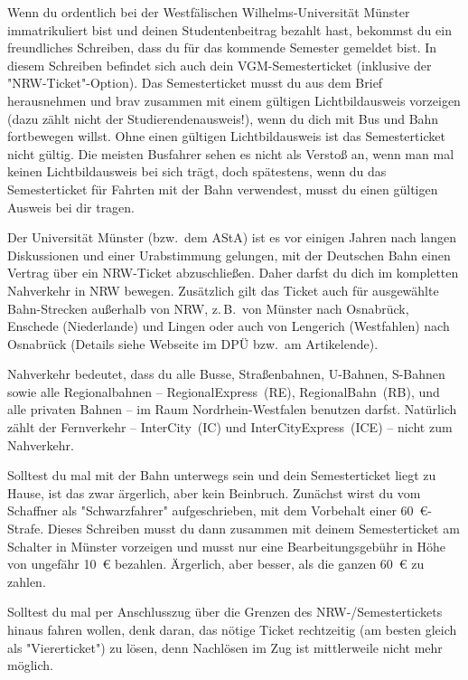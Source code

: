 \begin{multicols*}{2}
Wenn du ordentlich bei der Westfälischen Wilhelms-Universität Münster immatrikuliert bist und deinen Studentenbeitrag bezahlt hast, bekommst du ein freundliches Schreiben, dass du für das kommende Semester gemeldet bist.
In diesem Schreiben befindet sich auch dein VGM-Semesterticket (inklusive der "NRW-Ticket"-Option).
Das Semesterticket musst du aus dem Brief herausnehmen und brav zusammen mit einem gültigen Lichtbildausweis vorzeigen (dazu zählt nicht der Studierendenausweis!), wenn du dich mit Bus und Bahn fortbewegen willst.
Ohne einen gültigen Lichtbildausweis ist das Semesterticket nicht gültig.
Die meisten Busfahrer sehen es nicht als Verstoß an, wenn man mal keinen Lichtbildausweis bei sich trägt, doch spätestens, wenn du das Semesterticket für Fahrten mit der Bahn verwendest, musst du einen gültigen Ausweis bei dir tragen.

Der Universität Münster (bzw.\ dem AStA) ist es vor einigen Jahren nach langen Diskussionen und einer Urabstimmung gelungen, mit der Deutschen Bahn einen Vertrag über ein NRW-Ticket abzuschließen.
Daher darfst du dich im kompletten Nahverkehr in NRW bewegen.
Zusätzlich gilt das Ticket auch für ausgewählte Bahn-Strecken außerhalb von NRW, z.\,B.\ von Münster nach Osnabrück, Enschede (Niederlande) und Lingen oder auch von Lengerich (Westfahlen) nach Osnabrück (Details siehe Webseite im DPÜ bzw.\ am Artikelende).

Nahverkehr bedeutet, dass du alle Busse, Straßenbahnen, U-Bahnen, S-Bahnen sowie alle Regionalbahnen -- RegionalExpress~(RE), RegionalBahn~(RB), und alle privaten Bahnen -- im Raum Nordrhein-Westfalen benutzen darfst.
Natürlich zählt der Fernverkehr -- InterCity~(IC) und InterCityExpress~(ICE) -- nicht zum Nahverkehr.

Solltest du mal mit der Bahn unterwegs sein und dein Semesterticket liegt zu Hause, ist das zwar ärgerlich, aber kein Beinbruch.
Zunächst wirst du vom Schaffner als "Schwarzfahrer" aufgeschrieben, mit dem Vorbehalt einer \SI{60}{\euro}-Strafe.
Dieses Schreiben musst du dann zusammen mit deinem Semesterticket am Schalter in Münster vorzeigen und musst nur eine Bearbeitungsgebühr in Höhe von ungefähr \SI{10}{\euro} bezahlen.
Ärgerlich, aber besser, als die ganzen \SI{60}{\euro} zu zahlen.

Solltest du mal per Anschlusszug über die Grenzen des NRW-/Semestertickets hinaus fahren wollen, denk daran, das nötige Ticket rechtzeitig (am besten gleich als "Viererticket") zu lösen, denn Nachlösen im Zug ist mittlerweile nicht mehr möglich.


\end{multicols*}
